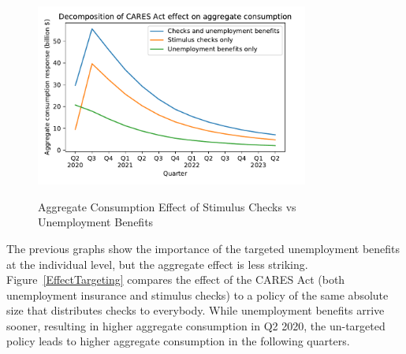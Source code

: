 \documentclass[titlepage]{\econtex}
\begin{document}
\begin{figure}
  \centering
  \caption{Aggregate Consumption Effect of Stimulus Checks vs Unemployment Benefits}
  \label{checks_vs_unemp}
  { \includegraphics[width=0.8\textwidth]{./Figures/Checks_vs_Unemp}}
\end{figure}

The previous graphs show the importance of the targeted unemployment benefits at the individual level, but the aggregate effect is less striking.
Figure~\ref{EffectTargeting} compares the effect of the CARES Act (both unemployment insurance and stimulus checks) to a policy of the same absolute size that distributes checks to everybody.
While unemployment benefits arrive sooner, resulting in higher aggregate consumption in Q2 2020, the un-targeted policy leads to higher aggregate consumption in the following quarters.
\end{document}
